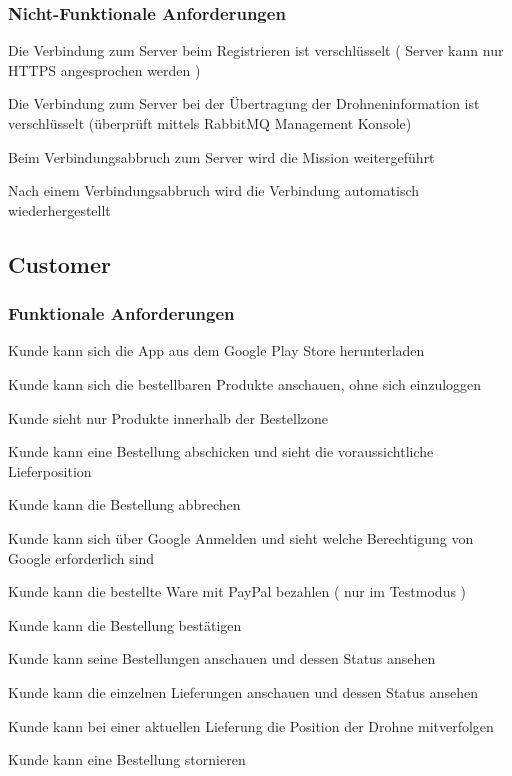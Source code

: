 \subsubsection{Nicht-Funktionale Anforderungen}
\begin{todolist}
	\item[\done] Die Verbindung zum Server beim Registrieren ist verschlüsselt ( Server kann nur HTTPS angesprochen werden )
	\item[\done] Die Verbindung zum Server bei der Übertragung der Drohneninformation ist verschlüsselt (überprüft mittels RabbitMQ Management Konsole)
	\item[\done] Beim Verbindungsabbruch zum Server wird die Mission weitergeführt
	\item[\done] Nach einem Verbindungsabbruch wird die Verbindung automatisch wiederhergestellt
\end{todolist}

\subsection{Customer}
\subsubsection{Funktionale Anforderungen}
\begin{todolist}
	\item Kunde kann sich die App aus dem Google Play Store herunterladen 
	\item[\done] Kunde kann sich die bestellbaren Produkte anschauen, ohne sich einzuloggen
	\item[\done] Kunde sieht nur Produkte innerhalb der Bestellzone
	\item[\done] Kunde kann eine Bestellung abschicken und sieht die voraussichtliche Lieferposition
	\item[\done] Kunde kann die Bestellung abbrechen
	\item[\done] Kunde kann sich über Google Anmelden und sieht welche Berechtigung von Google erforderlich sind
	\item[\done] Kunde kann die bestellte Ware mit PayPal bezahlen ( nur im Testmodus )
	\item[\done] Kunde kann die Bestellung bestätigen
	\item[\done] Kunde kann seine Bestellungen anschauen und dessen Status ansehen
	\item[\done] Kunde kann die einzelnen Lieferungen anschauen und dessen Status ansehen
	\item[\done] Kunde kann bei einer aktuellen Lieferung die Position der Drohne mitverfolgen
	\item Kunde kann eine Bestellung stornieren 
\end{todolist}


